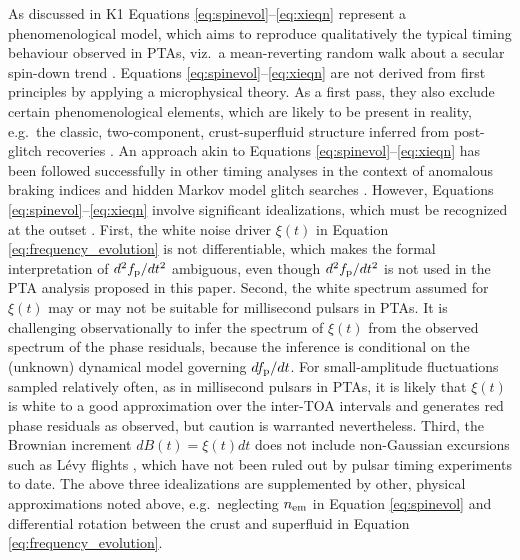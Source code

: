 \documentclass[fleqn,usenatbib,useAMS]{mnras}
\begin{document}
As discussed in K1
Equations \eqref{eq:spinevol}--\eqref{eq:xieqn} represent a phenomenological model, which aims to reproduce qualitatively the typical timing behaviour observed in PTAs, viz.\ a mean-reverting random walk about a secular spin-down trend \citep{NANOgrav2023,EPTA2023,Zic2023arXiv230616230Z}. Equations \eqref{eq:spinevol}--\eqref{eq:xieqn} are not derived from first principles by applying a microphysical theory. As a first pass, they also exclude certain phenomenological elements, which are likely to be present in reality, e.g.\ the classic, two-component, crust-superfluid structure inferred from post-glitch recoveries \citep{Baym1969,vanEysden,Alpar2017MNRAS.471.4827G,Myers2021MNRAS.502.3113M,Meyers2021}. An approach akin to Equations \eqref{eq:spinevol}--\eqref{eq:xieqn} has been followed successfully in other timing analyses in the context of anomalous braking indices \citep{Vargas} and hidden Markov model glitch searches \citep{Melatos2020ApJ...896...78M,Lower2021MNRAS.508.3251L,Dunn2022,Dunn2023MNRAS.522.5469D}. However, Equations \eqref{eq:spinevol}--\eqref{eq:xieqn}  involve significant idealizations, which must be recognized at the outset \citep{Meyers2021,Myers2021MNRAS.502.3113M,Vargas}. First, the white noise driver $\xi(t)$ in Equation \eqref{eq:frequency_evolution} is not differentiable, which makes the formal interpretation of $d^2 f_{\rm p} / dt^2$ ambiguous, even though $d^2 f_{\rm p} / dt^2$ is not used in the PTA analysis proposed in this paper. Second, the white spectrum assumed for $\xi(t)$ may or may not be suitable for millisecond pulsars in PTAs. It is challenging observationally to infer the spectrum of $\xi(t)$ from the observed spectrum of the phase residuals, because the inference is conditional on the (unknown) dynamical model governing $df_{\rm p}/dt$. For small-amplitude fluctuations sampled relatively often, as in millisecond pulsars in PTAs, it is likely that $\xi(t)$ is white to a good approximation over the inter-TOA intervals and generates red phase residuals as observed, but caution is warranted nevertheless. Third, the Brownian increment $dB(t)=\xi(t)dt$ does not include non-Gaussian excursions such as L\'{e}vy flights \citep{Sornette2004}, which have not been ruled out by pulsar timing experiments to date. The above three idealizations are supplemented by other, physical approximations noted above, e.g.\ neglecting $n_{\rm em}$ in Equation \eqref{eq:spinevol} and differential rotation between the crust and superfluid in Equation \eqref{eq:frequency_evolution}.
\end{document}
